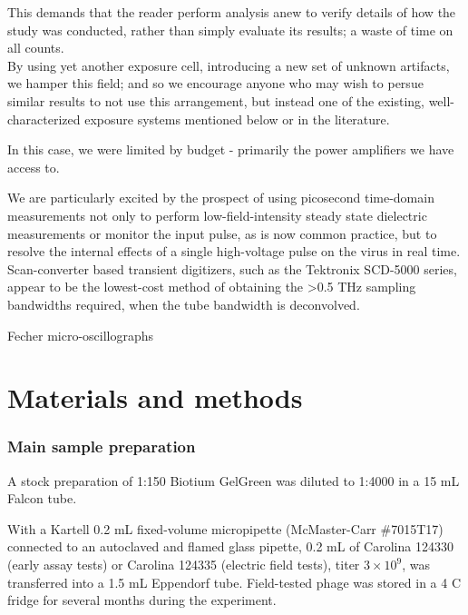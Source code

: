 \documentclass[paper.tex]{subfiles}
\begin{document}
\begin{multicols}{1}
\begin{tcolorbox}
	This demands that the reader perform analysis anew to verify details of how the study was conducted, rather than simply evaluate its results; a waste of time on all counts.\\
	
	By using yet another exposure cell, introducing a new set of unknown artifacts, we hamper this field; and so we encourage anyone who may wish to persue similar results to not use this arrangement, but instead one of the existing, well-characterized exposure systems mentioned below or in the literature.
	
	In this case, we were limited by budget - primarily the power amplifiers we have access to.
	
\end{tcolorbox}

We are particularly excited by the prospect of using picosecond time-domain measurements not only to perform low-field-intensity steady state dielectric measurements or monitor the input pulse, as is now common practice, but to resolve the internal effects of a single high-voltage pulse on the virus in real time. Scan-converter based transient digitizers, such as the Tektronix SCD-5000 series, appear to be the lowest-cost method of obtaining the >0.5 THz sampling bandwidths required, when the tube bandwidth is deconvolved.

Fecher\cite{Production1949} micro-oscillographs

\section{Materials and methods}

\subsubsection{Main sample preparation}

A stock preparation of 1:150 Biotium GelGreen was diluted to 1:4000 in a 15 mL Falcon tube.

With a Kartell 0.2 mL fixed-volume micropipette (McMaster-Carr \#7015T17) connected to an autoclaved and flamed glass pipette,  0.2 mL of Carolina 124330 (early assay tests) or Carolina 124335 (electric field tests), titer $3\times10^9$, was transferred into a 1.5 mL Eppendorf tube. Field-tested phage was stored in a 4 C fridge for several months during the experiment.


\end{multicols}
\end{document}
